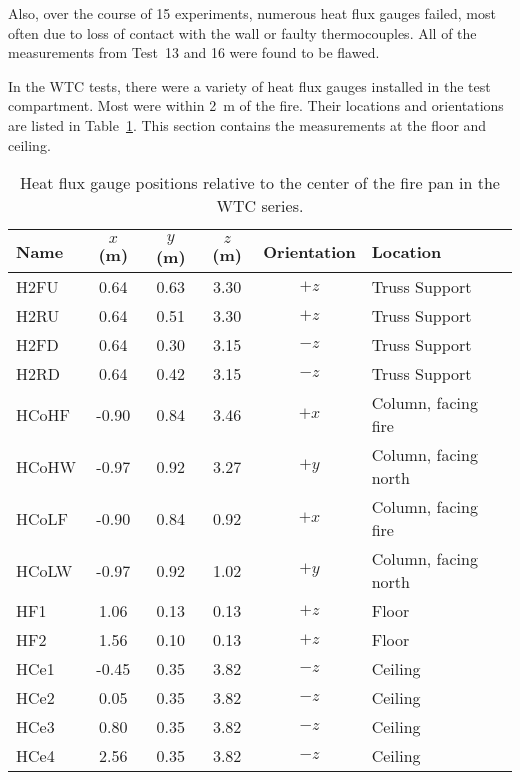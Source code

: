 Also, over the course of 15 experiments, numerous heat flux gauges failed, most often due to loss of contact with the wall or faulty thermocouples. All of the measurements from Test~13 and 16 were found to be flawed.

In the WTC tests, there were a variety of heat flux gauges installed in the test compartment. Most were within 2~m of the fire. Their locations and orientations are listed in Table~\ref{WTC_Gauges}. This section contains the measurements at the floor and ceiling.

\begin{table}[h!]
\caption{Heat flux gauge positions relative to the center of the fire pan in the WTC series.}
\begin{center}
\begin{tabular}{|l|c|c|c|c|l|}
\hline
Name    & $x$ (m)   & $y$ (m) & $z$ (m)   & Orientation  & Location  \\ \hline \hline
H2FU    & 0.64      & 0.63    & 3.30      &     $+z$     & Truss Support         \\ \hline
H2RU    & 0.64      & 0.51    & 3.30      &     $+z$     & Truss Support          \\ \hline
H2FD    & 0.64      & 0.30    & 3.15      &     $-z$     & Truss Support          \\ \hline
H2RD    & 0.64      & 0.42    & 3.15      &     $-z$     & Truss Support          \\ \hline
HCoHF   & -0.90     & 0.84    & 3.46      &     $+x$     & Column, facing fire          \\ \hline
HCoHW   & -0.97     & 0.92    & 3.27      &     $+y$     & Column, facing north          \\ \hline
HCoLF   & -0.90     & 0.84    & 0.92      &     $+x$     & Column, facing fire          \\ \hline
HCoLW   & -0.97     & 0.92    & 1.02      &     $+y$     & Column, facing north          \\ \hline
HF1     & 1.06      & 0.13    & 0.13      &     $+z$     & Floor          \\ \hline
HF2     & 1.56      & 0.10    & 0.13      &     $+z$     & Floor          \\ \hline
HCe1    & -0.45     & 0.35    & 3.82      &     $-z$     & Ceiling          \\ \hline
HCe2    &  0.05     & 0.35    & 3.82      &     $-z$     & Ceiling          \\ \hline
HCe3    &  0.80     & 0.35    & 3.82      &     $-z$     & Ceiling          \\ \hline
HCe4    &  2.56     & 0.35    & 3.82      &     $-z$     & Ceiling          \\ \hline
\end{tabular}
\end{center}
\label{WTC_Gauges}
\end{table}

